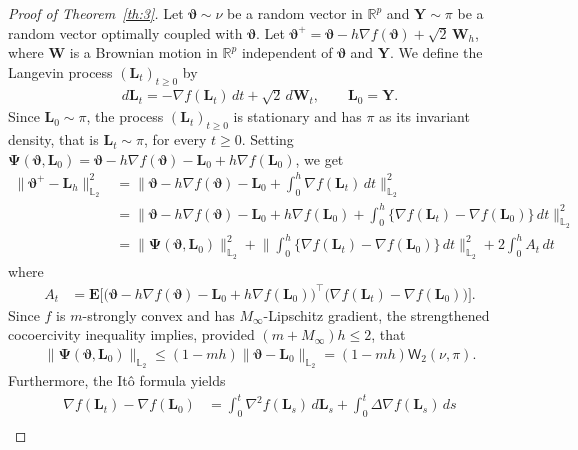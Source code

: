 \documentclass[aos,reqno]{imsart}
\newcommand\bL{\boldsymbol L}
\newcommand\bY{\boldsymbol Y}
\newcommand\bW{\boldsymbol W}
\newcommand\bvartheta{\boldsymbol\vartheta}
\def\wass{\mathsf{W}}
\def\Mmax{M_{\infty}}
\theoremstyle{definition}
\begin{document}
\begin{proof}[Proof of Theorem~\ref{th:3}]
Let $\bvartheta\sim \nu$ be a random vector in $\mathbb 
R^p$ and $\bY\sim\pi$ be a random vector optimally 
coupled with $\bvartheta$. Let $\bvartheta^+ = 
\bvartheta - h\nabla f(\bvartheta) + \sqrt{2}\,\bW_h$, 
where $\bW$ is a Brownian motion in $\mathbb R^p$ 
independent of $\bvartheta$ and $\bY$. We define the
Langevin process $(\bL_t)_{t\geqslant 0}$ by 
\begin{align}
    d\bL_t = -\nabla f(\bL_t)\,dt + \sqrt{2}\,
    d\bW_t,\qquad\bL_0 = \bY.
\end{align}
Since $\bL_0\sim\pi$, the process $(\bL_t)_{t
\geqslant 0}$ is stationary and has $\pi$ as its 
invariant density, that is $\bL_t\sim \pi$, for every 
$t\geqslant 0$. Setting $\boldsymbol{\Psi}
(\bvartheta,\bL_0) = \bvartheta - h\nabla f
(\bvartheta) - \bL_0 + h\nabla f(\bL_0)$, we get
\begin{align}
    \|\bvartheta^+ - \bL_h\|_{\mathbb L_2}^2
    & = 
    \Big\|\bvartheta - h\nabla f(\bvartheta) - 
    \bL_0 + \int_0^h \nabla f(\bL_t)\,dt
    \Big\|_{\mathbb L_2}^2\\
    &= \|\bvartheta - h\nabla f(\bvartheta) - 
    \bL_0
    +h\nabla f(\bL_0)+ \int_0^h \{\nabla f(\bL_t) 
    - \nabla f(\bL_0)\}\,dt\|_{\mathbb L_2}^2\\
    &=
    \|\boldsymbol{\Psi}(\bvartheta,\bL_0)\|_{
    \mathbb L_2}^2
    +\Big\|\int_0^h \{\nabla f(\bL_t) - \nabla f
    (\bL_0)\}\,dt\Big\|_{\mathbb L_2}^2 + 2\int_0^h
    A_t\,dt\label{eq:4:3}
\end{align}
where
\begin{align}
    A_t & = \mathbf E\Big[\Big(\bvartheta - h\nabla f 
    (\bvartheta) - \bL_0 + h\nabla f(\bL_0)\Big)^\top 
    \Big(\nabla f(\bL_t) - \nabla f(\bL_0)\Big)\Big].
\end{align}
Since $f$ is $m$-strongly convex and has $\Mmax$-Lipschitz
gradient, the strengthened cocoercivity inequality implies,
provided $(m+\Mmax)h\leqslant 2$, that
\begin{align}\label{eq:4.6}
    \big\|\boldsymbol{\Psi}(\bvartheta,\bL_0)
    \big\|_{\mathbb L_2} \leqslant (1-mh)\|\bvartheta 
    - \bL_0\|_{\mathbb L_2}
    =(1-mh)\wass_2(\nu,\pi).
\end{align}
Furthermore, the It\^o formula yields
\begin{align}
    \nabla f(\bL_t) - \nabla f(\bL_0) 
    &=  \int_0^t \nabla^2 f(\bL_s)\,d\bL_s 
    + \int_0^t \Delta \nabla f(\bL_s)\,ds \\

\end{align}
\end{proof}
\end{document}
